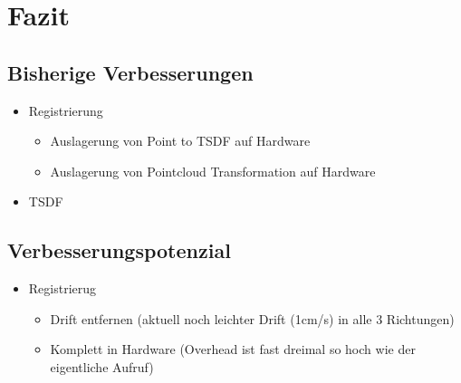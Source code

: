 \documentclass{beamer}
\begin{document}
\section{Fazit}
\begin{frame}{}
\begin{center}
\end{center}
\end{frame}

\subsection{Bisherige Verbesserungen}
\begin{frame}{\subsecname}
\begin{itemize}
\item{Registrierung}
\begin{itemize}
\item{Auslagerung von Point to TSDF auf Hardware}
\item{Auslagerung von Pointcloud Transformation auf Hardware}
\end{itemize}
\item{TSDF}
\end{itemize}
\end{frame}

\subsection{Verbesserungspotenzial}
\begin{frame}{\subsecname}
\begin{itemize}
\item{Registrierug}
\begin{itemize}
\item{Drift entfernen (aktuell noch leichter Drift (1cm/s) in alle 3 Richtungen)}
\item{Komplett in Hardware (Overhead ist fast dreimal so hoch wie der eigentliche Aufruf)}
\end{itemize}
\end{itemize}
\end{frame}
\end{document}
